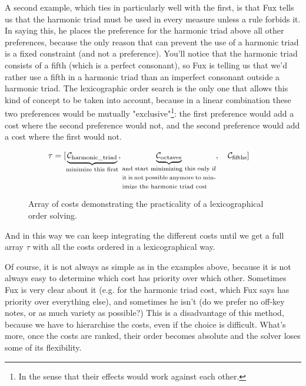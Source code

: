 A second example, which ties in particularly well with the first, is that Fux tells us that the harmonic triad must be used in every measure unless a rule forbids it. In saying this, he places the preference for the harmonic triad above all other preferences, because the only reason that can prevent the use of a harmonic triad is a fixed constraint (and not a preference). You'll notice that the harmonic triad consists of a fifth (which is a perfect consonant), so Fux is telling us that we'd rather use a fifth in a harmonic triad than an imperfect consonant outside a harmonic triad. The lexicographic order search is the only one that allows this kind of concept to be taken into account, because in a linear combination these two preferences would be mutually "exclusive"\footnote{In the sense that their effects would work against each other.}: the first preference would add a cost where the second preference would not, and the second preference would add a cost where the first would not.

\begin{figure}[h]
    \begin{equation}
        \begin{aligned}
            \tau = [& \underset{\text{\fontsize{7}{11}\selectfont{minimize this first}}}{\underbrace{\mathcal{C}_\text{harmonic\_triad}}}, \underset{\text{\fontsize{7}{11}\selectfont\parbox{4cm}{and start minimizing this only if it is not possible anymore to minimize the harmonic triad cost}}}{\underbrace{\mathcal{C}_\text{octaves}}},\quad  \mathcal{C}_\text{fifths}]
        \end{aligned}
    \end{equation}
    \caption{Array of costs demonstrating the practicality of a lexicographical order solving.}
\end{figure}

And in this way we can keep integrating the different costs until we get a full array $\tau$ with all the costs ordered in a lexicographical way.

Of course, it is not always as simple as in the examples above, because it is not always easy to determine which cost has priority over which other. Sometimes Fux is very clear about it (e.g. for the harmonic triad cost, which Fux says has priority over everything else), and sometimes he isn't (do we prefer no off-key notes, or as much variety as possible?) This is a disadvantage of this method, because we have to hierarchise the costs, even if the choice is difficult. What's more, once the costs are ranked, their order becomes absolute and the solver loses some of its flexibility.

